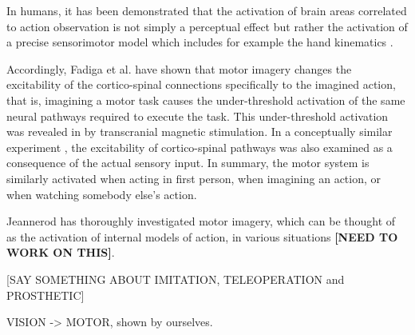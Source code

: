 In humans, it has been demonstrated that the activation of brain areas correlated to 
action observation is not simply a perceptual effect but rather the activation of
a precise sensorimotor model which includes for example the hand kinematics \cite{pozzo-06}.
 
Accordingly, Fadiga et al. \cite{} have shown that motor imagery changes the excitability
of the cortico-spinal connections specifically to the imagined action, that is, 
imagining a motor task causes the under-threshold activation of the same neural pathways 
required to execute the task. This under-threshold activation was revealed in \cite{} 
by transcranial magnetic stimulation. In a conceptually similar experiment \cite{}, the 
excitability of cortico-spinal pathways was also examined as a consequence of the actual 
sensory input. In summary, the motor system is similarly activated when acting in first
person, when imagining an action, or when watching somebody else's action.

Jeannerod \cite{} has thoroughly investigated motor imagery, which can be thought of as the 
activation of internal models of action, in various situations {\bf [NEED TO WORK ON THIS]}.

[SAY SOMETHING ABOUT IMITATION, TELEOPERATION and PROSTHETIC]

VISION -> MOTOR, shown by ourselves.